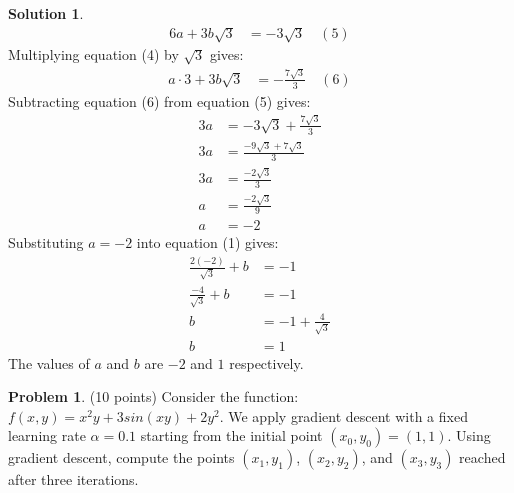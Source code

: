 \documentclass[11pt]{article}
\theoremstyle{definition}
\newtheorem{problem}{Problem}
\newtheorem*{solution}{Solution}
\begin{document}
\begin{solution}
    \begin{align}
        6a + 3b\sqrt{3} &= -3\sqrt{3} \quad (5)
    \end{align}
    Multiplying equation (4) by $\sqrt{3}$ gives:
    \begin{align}
        a \cdot 3 + 3b\sqrt{3} &= -\frac{7\sqrt{3}}{3} \quad (6)
    \end{align}
    Subtracting equation (6) from equation (5) gives:
    \begin{align}
        3a &= -3\sqrt{3} + \frac{7\sqrt{3}}{3} \\
        3a &= \frac{-9\sqrt{3} + 7\sqrt{3}}{3} \\
        3a &= \frac{-2\sqrt{3}}{3} \\
        a &= \frac{-2\sqrt{3}}{9} \\
        a &= -2
    \end{align}
    Substituting $a = -2$ into equation (1) gives:
    \begin{align}
        \frac{2(-2)}{\sqrt{3}} + b &= -1 \\
        \frac{-4}{\sqrt{3}} + b &= -1 \\
        b &= -1 + \frac{4}{\sqrt{3}} \\
        b &= 1
    \end{align}
    The values of $a$ and $b$ are $-2$ and $1$ respectively.
\end{solution}


\begin{problem}
(10 points) Consider the function: $f(x,y) = x^2y + 3sin(xy) + 2y^2$.  We apply gradient descent with a fixed learning rate $\alpha = 0.1$
starting from the initial point $(x_0, y_0) = (1,1)$. Using gradient descent, compute the points $(x_1, y_1)$, $(x_2, y_2)$, and $(x_3, y_3)$
reached after three iterations.
\end{problem}
\end{document}
